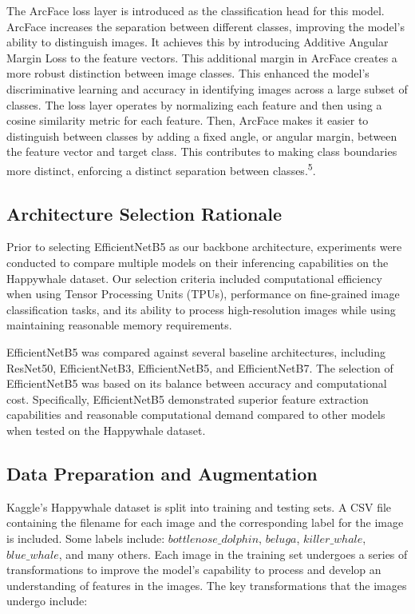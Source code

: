 \documentclass[twocolumn]{article}
\begin{document}
The ArcFace loss layer is introduced as the classification head for this model. ArcFace increases the separation between different classes, improving the model’s ability to distinguish images. It achieves this by introducing Additive Angular Margin Loss to the feature vectors. This additional margin in ArcFace creates a more robust distinction between image classes. This enhanced the model’s discriminative learning and accuracy in identifying images across a large subset of classes. The loss layer operates by normalizing each feature and then using a cosine similarity metric for each feature. Then, ArcFace makes it easier to distinguish between classes by adding a fixed angle, or angular margin, between the feature vector and target class. This contributes to making class boundaries more distinct, enforcing a distinct separation between classes.\textsuperscript{5}.

\subsection{Architecture Selection Rationale}

Prior to selecting EfficientNetB5 as our backbone architecture, experiments were conducted to compare multiple models on their inferencing capabilities on the Happywhale dataset. Our selection criteria included computational efficiency when using Tensor Processing Units (TPUs), performance on fine-grained image classification tasks, and its ability to process high-resolution images while using maintaining reasonable memory requirements. 

EfficientNetB5 was compared against several baseline architectures, including ResNet50, EfficientNetB3, EfficientNetB5, and EfficientNetB7. The selection of EfficientNetB5 was based on its balance between accuracy and computational cost. Specifically, EfficientNetB5 demonstrated superior feature extraction capabilities and reasonable computational demand compared to other models when tested on the Happywhale dataset.

\subsection{Data Preparation and Augmentation}

Kaggle’s Happywhale dataset is split into training and testing sets. A CSV file containing the filename for each image and the corresponding label for the image is included. Some labels include: \(bottlenose\_dolphin\), \(beluga\), \(killer\_whale\), \(blue\_whale\), and many others. Each image in the training set undergoes a series of transformations to improve the model’s capability to process and develop an understanding of features in the images. The key transformations that the images undergo include:
\end{document}
